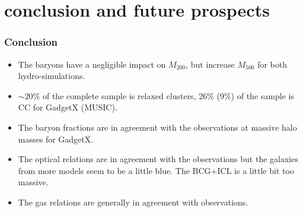 \documentclass[aspectratio=43]{beamer}
\begin{document}
\section{conclusion and future prospects}
\begin{frame}
  \frametitle{Conclusion}
  {
  \begin{itemize}
    \item The baryons have a negligible impact on $M_{200}$, but increase $M_{500}$ for both hydro-simulations.
    \item $\sim 20 \%$ of the complete sample is relaxed clusters, 26\% (9\%) of the sample is CC for GadgetX (MUSIC).
    \item The baryon fractions are in agreement with the observations at massive halo masses for GadgetX.
    \item The optical relations are in agreement with the observations but the galaxies from more models seem to be a little blue. The BCG+ICL is a little bit too massive.
    \item The gas relations are generally in agreement with observations.
  \end{itemize}}
\end{frame}

\end{document}
